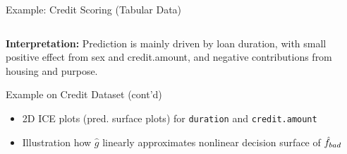\documentclass[10pt,compress,t,notes=noshow, xcolor=table]{beamer}
\newcommand{\gh}{\hat{g}}
\begin{document}
\begin{frame}{Example: Credit Scoring (Tabular Data)}
\begin{columns}[T,onlytextwidth]
\end{columns}
\textbf{Interpretation:} Prediction is mainly driven by loan duration, with small positive effect from sex and credit.amount, and negative contributions from housing and purpose.
\end{frame}

\begin{frame}{Example on Credit Dataset (cont'd)}

\begin{itemize}
  \item 2D ICE plots (pred. surface plots) for \texttt{duration} and \texttt{credit.amount} 
  \item Illustration how \( \gh \) linearly approximates nonlinear decision surface of \( \hat{f}_{bad} \)
\end{itemize}


\end{frame}
\end{document}

